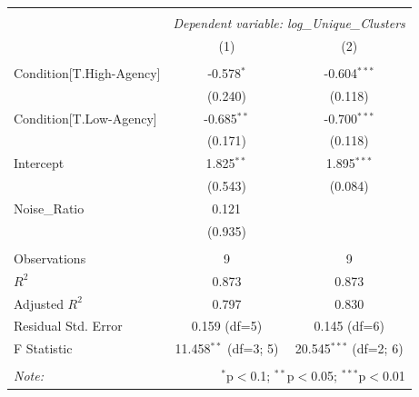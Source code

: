 \begin{table}[!htbp] \centering
\begin{tabular}{@{\extracolsep{5pt}}lcc}
\\[-1.8ex]\hline
\hline \\[-1.8ex]
& \multicolumn{2}{c}{\textit{Dependent variable: log_Unique_Clusters}} \
\cr \cline{2-3}
\\[-1.8ex] & (1) & (2) \\
\hline \\[-1.8ex]
 Condition[T.High-Agency] & -0.578$^{*}$ & -0.604$^{***}$ \\
& (0.240) & (0.118) \\
 Condition[T.Low-Agency] & -0.685$^{**}$ & -0.700$^{***}$ \\
& (0.171) & (0.118) \\
 Intercept & 1.825$^{**}$ & 1.895$^{***}$ \\
& (0.543) & (0.084) \\
 Noise_Ratio & 0.121$^{}$ & \\
& (0.935) & \\
\hline \\[-1.8ex]
 Observations & 9 & 9 \\
 $R^2$ & 0.873 & 0.873 \\
 Adjusted $R^2$ & 0.797 & 0.830 \\
 Residual Std. Error & 0.159 (df=5) & 0.145 (df=6) \\
 F Statistic & 11.458$^{**}$ (df=3; 5) & 20.545$^{***}$ (df=2; 6) \\
\hline
\hline \\[-1.8ex]
\textit{Note:} & \multicolumn{2}{r}{$^{*}$p$<$0.1; $^{**}$p$<$0.05; $^{***}$p$<$0.01} \\
\end{tabular}
\end{table}